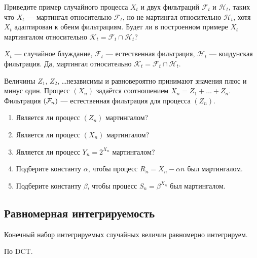 \begin{problem}
Приведите пример случайного процесса $X_t$ и двух фильтраций $\mathcal{F}_t$ и $\mathcal{H}_t$, таких что $X_t$ — мартингал относительно $\mathcal{F}_t$, но не мартингал относительно $\mathcal{H}_t$, хотя $X_t$ адаптирован к обеим фильтрациям. Будет ли в построенном примере $X_t$ мартингалом относительно $\mathcal{K}_t=\mathcal{F}_t \cap \mathcal{H}_t$?


\begin{sol}

$X_t$ — случайное блуждание, $\mathcal{F}_t$ — естественная фильтрация, $\mathcal{H}_t$ — колдунская фильтрация. Да, мартингал относительно $\mathcal{K}_t=\mathcal{F}_t \cap \mathcal{H}_t$.
\end{sol}
\end{problem}


\begin{problem}
Величины $Z_1$, $Z_2$, \ldots независимы и равновероятно принимают значения плюс и минус один. Процесс $(X_n)$ задаётся соотношением $X_n=Z_1+ \ldots + Z_n$. Фильтрация $(\mathcal{F}_n)$ — естественная фильтрация для процесса $(Z_n)$.

\begin{enumerate}
  \item Является ли процесс $(Z_n)$ мартингалом?
  \item Является ли процесс $(X_n)$ мартингалом?
  \item Является ли процесс $Y_n=2^{X_n}$ мартингалом?
  \item Подберите константу $\alpha$, чтобы процесс $R_n = X_n - \alpha n$ был мартингалом.
  \item Подберите константу $\beta$, чтобы процесс $S_n = \beta^{X_n}$ был мартингалом.
\end{enumerate}


\begin{sol}
\end{sol}
\end{problem}


\subsection{Равномерная интегрируемость}

\begin{problem}
Конечный набор интегрируемых случайных величин равномерно
интегрируем.

\begin{sol}
 По DCT.
\end{sol}
\end{problem}

